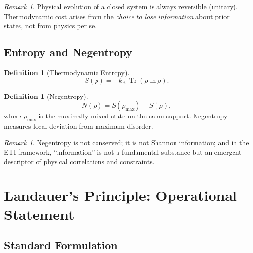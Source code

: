 \documentclass[12pt,letterpaper]{article}
\theoremstyle{plain}
\theoremstyle{definition}
\newtheorem{definition}[theorem]{Definition}
\theoremstyle{remark}
\newtheorem{remark}[theorem]{Remark}
\newcommand{\tr}{\operatorname{Tr}}
\newcommand{\kB}{k_{\mathrm{B}}}
\begin{document}
\begin{remark}
Physical evolution of a closed system is always reversible (unitary).  Thermodynamic cost
arises from the \emph{choice to lose information} about prior states, not from physics per se.
\end{remark}

\subsection{Entropy and Negentropy}

\begin{definition}[Thermodynamic Entropy]
\begin{equation}
  S(\rho) = -\kB\,\tr(\rho\ln\rho).
  \label{eq:vN-entropy}
\end{equation}
\end{definition}

\begin{definition}[Negentropy]
\begin{equation}
  N(\rho) = S(\rho_{\max}) - S(\rho),
  \label{eq:negentropy}
\end{equation}
where $\rho_{\max}$ is the maximally mixed state on the same support.  Negentropy measures
local deviation from maximum disorder.
\end{definition}

\begin{remark}
Negentropy is not conserved; it is not Shannon information; and in the ETI framework,
``information'' is not a fundamental substance but an emergent descriptor of physical
correlations and constraints.
\end{remark}

\section{Landauer's Principle: Operational Statement}
\label{sec:landauer}

\subsection{Standard Formulation}
\end{document}
